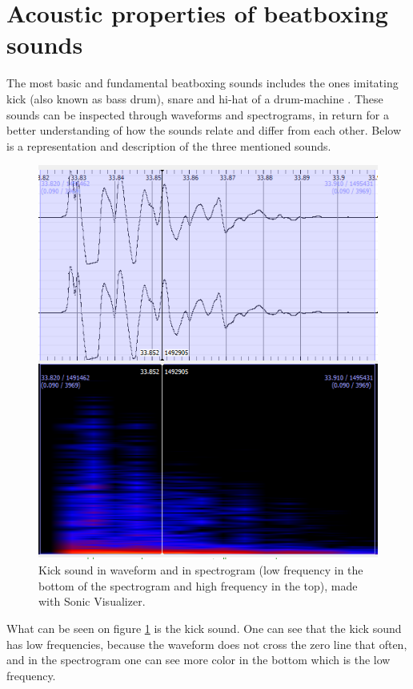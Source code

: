 \section{Acoustic properties of beatboxing sounds}
The most basic and fundamental beatboxing sounds includes the ones imitating kick (also known as bass drum), snare and hi-hat of a drum-machine \citep{Stowell2010}. These sounds can be inspected through waveforms and spectrograms, in return for a better understanding of how the sounds relate and differ from each other. Below is a representation and description of the three mentioned sounds. \\

\begin{figure}[h]
	\begin{center}
		\includegraphics[scale = 0.5]{fig/Kick-closeup-with-spectrogram.png}
		\caption{Kick sound in waveform and in spectrogram (low frequency in the bottom of the spectrogram and high frequency in the top), made with Sonic Visualizer.}
		\label{KickClose}
	\end{center}
\end{figure} 

\begin{flushleft}
What can be seen on figure \ref{KickClose} is the kick sound. One can see that the kick sound has low frequencies, because the waveform does not cross the zero line that often, and in the spectrogram one can see more color in the bottom which is the low frequency.\\ 
\end{flushleft}

